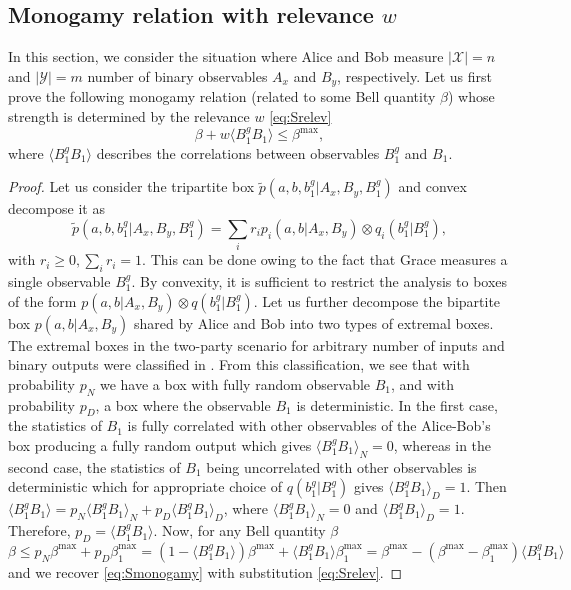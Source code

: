 \documentclass[pra,twocolumn,showpacs,preprintnumbers,amsmath,amssymb,superscriptaddress]{revtex4-1}
\def\be{\begin{equation}}
\def\ee{\end{equation}}
\def\>{\rangle}
\def\<{\langle}
\def\omeas{B_1}
\def\ogentle{B_1^g}
\def\relev{w}
\begin{document}
\begin{appendix}
\subsection{Monogamy relation with relevance $\relev$}\label{secRELEV1}
In this section, we consider the situation where Alice and Bob measure $\vert \mathcal{X} \vert = n$ and $\vert \mathcal{Y}\vert = m$ number of binary observables $A_x$ and $B_y$, respectively. Let us first prove the following monogamy relation (related to some Bell quantity $\beta$) whose strength is determined by the relevance $\relev$ \eqref{eq:Srelev}
 \be
\beta + \relev \<\ogentle\omeas\> \leq \beta^{\max},
\label{eq:Smonogamy}
\ee
where $\<\ogentle\omeas\>$ describes the correlations between observables $\ogentle$ and $\omeas$.

\begin{proof}

Let us consider the tripartite box $\tilde p(a,b,b_1^g|A_x,B_y,\ogentle)$ and convex decompose it as 
\be 
\tilde p(a,b,b_1^g|A_x,B_y,\ogentle) = \sum_i r_i  p_i(a,b|A_x,B_y) \otimes q_i(b_1^g|\ogentle),
\ee 
with $r_i \geq 0, \sum_i r_i = 1$. This can be done owing to the fact that Grace measures a single observable $\ogentle$. By convexity, it is sufficient to restrict the analysis to boxes of the form $p(a,b|A_x,B_y) \otimes q(b_1^g|\ogentle)$.  
Let us further decompose the bipartite box $p(a,b|A_x, B_y)$ shared by Alice and Bob into two types of extremal boxes. The extremal boxes in the two-party scenario for arbitrary number of inputs and binary outputs were classified in \cite{JonesMasanes2005}. From this classification, we see that with probability $p_N$ we have a box with fully random observable $B_1$, and with probability $p_D$, a box where the observable $B_1$ is deterministic. In the first case, the statistics of $\omeas$ is fully correlated with other observables of the Alice-Bob's box producing a fully random output which gives $\<\ogentle\omeas \>_N=0$, whereas in the second case, the statistics of $\omeas$ being uncorrelated with other observables is deterministic which for appropriate choice of $q(b_1^g|\ogentle)$ gives $\<\ogentle\omeas \>_D=1$.  Then $\<\ogentle\omeas\> = p_N \<\ogentle\omeas\>_N + p_D \<\ogentle\omeas\>_D $, where $ \<\ogentle\omeas\>_N=0$ and $ \<\ogentle\omeas\>_D=1$. Therefore, $p_D = \<\ogentle\omeas\>$.
Now, for any Bell quantity $\beta$
\be
\beta \leq p_N \beta^{\max} + p_D \beta^{\max}_{1} = (1- \<\ogentle\omeas\>) \beta^{\max} + \<\ogentle\omeas\> \beta^{\max}_{1} =  \beta^{\max}  - (\beta^{\max} - \beta^{\max}_{1}) \<\ogentle\omeas\>
\ee
and we recover \eqref{eq:Smonogamy} with substitution \eqref{eq:Srelev}.
\end{proof}


\end{appendix}
\end{document}
